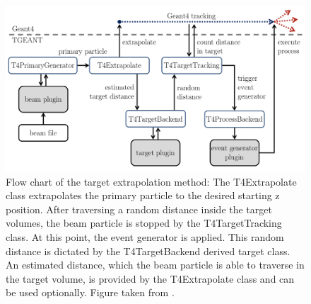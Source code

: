 \begin{figure}[!h]
  \centering
	\includegraphics[scale=0.5]{./gfx/Targetextrap.png}
	\caption{Flow chart of the target extrapolation method: The T4Extrapolate class extrapolates the primary particle to the desired starting z position. After traversing a random distance inside the target volumes, the beam particle is stopped by the T4TargetTracking class. At this point, the event generator is applied. This random distance is dictated by the T4TargetBackend derived target class. An estimated distance, which the beam particle is able to traverse in the target volume, is provided by the T4Extrapolate class and can be used optionally. Figure taken from \cite{Tobias}.}
	\label{pic:Targetextrap}
\end{figure}

